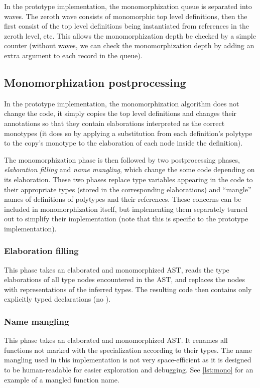 In the prototype implementation, the monomorphization queue is separated into waves. The zeroth wave consists of monomorphic top level definitions, then the first consist of the top level definitions being instantiated from references in the zeroth level, etc. This allows the monomorphization depth be checked by a simple counter (without waves, we can check the monomorphization depth by adding an extra argument to each record in the queue).

\subsection{Monomorphization postprocessing}

In the prototype implementation, the monomorphization algorithm does not change the code, it simply copies the top level definitions and changes their annotations so that they contain elaborations interpreted as the correct monotypes (it does so by applying a substitution from each definition's polytype to the copy's monotype to the elaboration of each node inside the definition).

The monomorphization phase is then followed by two postprocessing phases, \emph{elaboration filling} and \emph{name mangling}, which change the some code depending on its elaboration. These two phases replace type variables appearing in the code to their appropriate types (stored in the corresponding elaborations) and ``mangle'' names of definitions of polytypes and their references. These concerns can be included in monomorphization itself, but implementing them separately turned out to simplify their implementation (note that this is specific to the prototype implementation).

\subsubsection{Elaboration filling}

This phase takes an elaborated and monomorphized AST, reads the type elaborations of all type nodes encountered in the AST, and replaces the nodes with representations of the inferred types. The resulting code then contains only explicitly typed declarations (no ).

\subsubsection{Name mangling}
\label{sec:mangling}

This phase takes an elaborated and monomorphized AST. It renames all functions not marked with the  specialization according to their types. The name mangling used in this implementation is not very space-efficient as it is designed to be human-readable for easier exploration and debugging. See \cref{lst:mono} for an example of a mangled function name.

